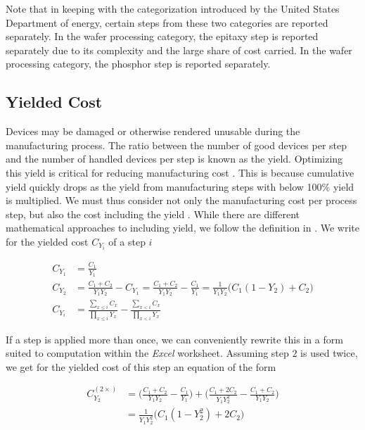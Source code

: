 \documentclass[10pt]{article}
\begin{document}
Note that in keeping with the categorization introduced by the United States Department of energy, certain steps from these two categories are reported separately. In the wafer processing category, the epitaxy step is reported separately due to its complexity and the large share of cost carried. In the wafer processing category, the phosphor step is reported separately.

\subsection{Yielded Cost}

Devices may be damaged or otherwise rendered unusable during the manufacturing process. The ratio between the number of good devices per step and the number of handled devices per step is known as the yield. Optimizing this yield is critical for reducing manufacturing cost \cite{Kumar2006}. This is because cumulative yield quickly drops as the yield from manufacturing steps with below 100\% yield is multiplied. We must thus consider not only the manufacturing cost per process step, but also the cost including the yield \cite{becker2001use}\cite{becker2001using}. While there are different mathematical approaches to including yield, we follow the definition in  \cite{becker2001use}. We write for the yielded cost $C_{Y_i}$ of a step $i$

\begin{equation}
\begin{split}
\label{eqn:C_2}
    C_{Y_1} &= \frac{C_1}{Y_1} \\
    C_{Y_2} &= \frac{C_1 + C_2}{Y_1 Y_2} - C_{Y_1} = \frac{C_1 + C_2}{Y_1 Y_2} - \frac{C_1}{Y_1} = \frac{1}{Y_1 Y_2} \bigg ( C_1 (1-Y_2) +C_2 \bigg)\\
    C_{Y_i} &= \frac{ \sum_{x \leq i} C_x }{ \prod_{x \leq i} Y_x } - \frac{ \sum_{x<i} C_x }{ \prod_{x<i} Y_x }
\end{split}
\end{equation}

If a step is applied more than once, we can conveniently rewrite this in a form suited to computation within the \textit{Excel} worksheet. Assuming step $2$ is used twice, we get for the yielded cost of this step an equation of the form

\begin{align}
\label{eqn:C_2^2}
    C_{Y_2}^{(2 \times)} &= \bigg( \frac{C_1 + C_2}{Y_1 Y_2} - \frac{C_1}{Y_1} \bigg) + \bigg( \frac{C_1 + 2 C_2}{Y_1 Y_2^2} - \frac{C_1 + C_2}{Y_1 Y_2}     \bigg) \\
    &= \frac{1}{Y_1 Y_2^2} \bigg( C_1 (1-Y_2^2) +2C_2 \bigg)
\end{align}
\end{document}
